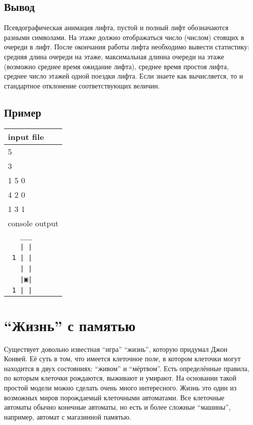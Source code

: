 \documentclass[12pt, oneside]{article}
\begin{document}
\subsection*{Вывод}

Псевдографическая анимация лифта, пустой и полный лифт обозначаются разными символами. На этаже должно отображаться число (числом) стоящих в очереди в лифт. После окончания работы лифта необходимо вывести статистику: средняя длина очереди на этаже, максимальная длинна очереди на этаже (возможно среднее время ожидание лифта), среднее время простоя лифта, среднее число этажей одной поездки лифта. Если знаете как вычисляется, то и стандартное отклонение соответствующих величин. 

\subsection*{Пример}

\begin{tabular}{| p{} |}
\hline
input file\\
\hline
5\\
3\\
1 5 0\\
4 2 0\\
1 3 1\\
\hline
console output\\
\hline
\verb'   ___ '\\
\verb'   | | '\\
\verb' 1 | | '\\
\verb'   | | '\\
\verb'   |▣| '\\
\verb' 1 | | '\\
\hline
\end{tabular}

\section{``Жизнь'' с памятью}
Существует довольно известная ``игра'' ``жизнь'', которую придумал Джон Конвей. Её суть в том, что имеется клеточное поле, в котором клеточки могут находится в двух состояниях: ``живом'' и ``мёртвом''. Есть определённые правила, по которым клеточки рождаются, выживают и умирают. На основании такой простой модели можно сделать очень много интересного. Жизнь это один из возможных миров порождаемый клеточными автоматами. Все клеточные автоматы обычно конечные автоматы, но есть и более сложные ``машины'', например, автомат с магазинной памятью.
\end{document}
